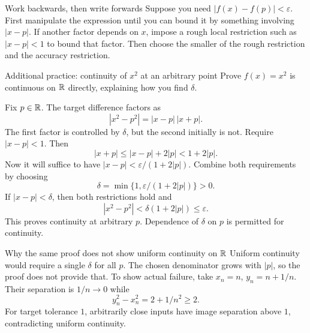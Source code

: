 \begin{method}{Work backwards, then write forwards}
Suppose you need $|f(x)-f(p)|<\varepsilon$. First manipulate the expression until you can bound it by something involving $|x-p|$. If another factor depends on $x$, impose a rough local restriction such as $|x-p|<1$ to bound that factor. Then choose the smaller of the rough restriction and the accuracy restriction.
\end{method}
\begin{exam}{Additional practice: continuity of $x^2$ at an arbitrary point}
Prove $f(x)=x^2$ is continuous on $\mathbb R$ directly, explaining how you find $\delta$.
\end{exam}
\begin{answer}
Fix $p\in\mathbb R$. The target difference factors as
\[|x^2-p^2|=|x-p|\,|x+p|.\]
The first factor is controlled by $\delta$, but the second initially is not. Require $|x-p|<1$. Then
\[|x+p|\le|x-p|+2|p|<1+2|p|.\]
Now it will suffice to have $|x-p|<\varepsilon/(1+2|p|)$. Combine both requirements by choosing
\[\delta=\min\{1,\varepsilon/(1+2|p|)\}>0.\]
If $|x-p|<\delta$, then both restrictions hold and
\[|x^2-p^2|<\delta(1+2|p|)\le\varepsilon.\]
This proves continuity at arbitrary $p$. Dependence of $\delta$ on $p$ is permitted for continuity.
\end{answer}
\begin{note}{Why the same proof does not show uniform continuity on $\mathbb R$}
Uniform continuity would require a single $\delta$ for all $p$. The chosen denominator grows with $|p|$, so the proof does not provide that. To show actual failure, take $x_n=n$, $y_n=n+1/n$. Their separation is $1/n\to0$ while
\[y_n^2-x_n^2=2+1/n^2\ge2.\]
For target tolerance $1$, arbitrarily close inputs have image separation above $1$, contradicting uniform continuity.
\end{note}


